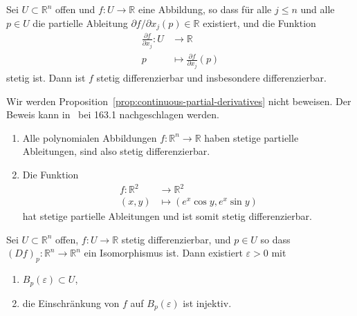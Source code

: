 \documentclass[../main.tex]{subfiles}
\begin{document}
\begin{proposition}\label{prop:continuous-partial-derivatives}
  Sei $U \subset \mathbb{R}^n$ offen und
  $f \colon U \to \mathbb{R}$ eine Abbildung,
  so dass für alle $j \leq n$ und alle $p \in U$ 
  die partielle Ableitung $\partial f/ \partial x_j (p) \in \mathbb{R}$ 
  existiert, und die Funktion
  \begin{align*}
    \frac{\partial f}{\partial x_j} \colon U & \to \mathbb{R} \\
    p & \mapsto \frac{\partial f}{\partial x_j}(p)
  \end{align*}
  stetig ist.
  Dann ist $f$ stetig differenzierbar und insbesondere differenzierbar.
\end{proposition}

Wir werden Proposition~\ref{prop:continuous-partial-derivatives}
nicht beweisen. Der Beweis kann
in~\cite{heuser} bei 163.1 nachgeschlagen werden.

\begin{examples}
  \leavevmode
  \begin{enumerate}[(1)]
    \item Alle polynomialen Abbildungen $f \colon \mathbb{R}^n \to \mathbb{R}$ 
      haben stetige partielle Ableitungen, sind also
      stetig differenzierbar.
    \item Die Funktion
      \begin{align*}
        f \colon \mathbb{R}^2 & \to \mathbb{R}^2 \\
        (x, y) & \mapsto (e^x \cos y, e^x \sin y)
      \end{align*}
      hat stetige partielle Ableitungen und ist somit stetig
      differenzierbar.
  \end{enumerate}
\end{examples}

\begin{proposition}\label{prop:local-injectivity}
  Sei $U \subset \mathbb{R}^n$ offen,
  $f \colon U \to \mathbb{R}$ stetig differenzierbar,
  und $p \in U$ so dass
  ${(Df)}_p \colon \mathbb{R}^n \to \mathbb{R}^n$ 
  ein Isomorphismus ist.
  Dann existiert $\varepsilon > 0$ mit
  \begin{enumerate}[\normalfont(i)]
    \item $B_p(\varepsilon) \subset U$,
    \item die Einschränkung von $f$ auf $B_p(\varepsilon)$ ist
      injektiv.
  \end{enumerate}
\end{proposition}
\end{document}
